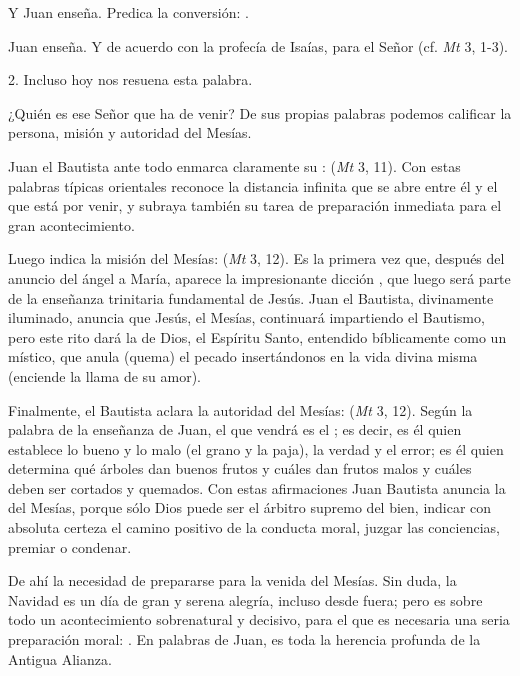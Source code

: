 \begin{body}
\begin{body}
	Y Juan enseña. Predica la conversión: .
	
	Juan enseña. Y de acuerdo con la profecía de Isaías,  para el Señor (cf. \emph{Mt} 3, 1-3).
	
	2. Incluso hoy nos resuena esta palabra.
	
	¿Quién es ese Señor que ha de venir? De sus propias palabras podemos calificar la persona, misión y autoridad del Mesías.
	
	Juan el Bautista ante todo enmarca claramente su :  (\emph{Mt} 3, 11). Con estas palabras típicas orientales reconoce la distancia infinita que se abre entre él y el que está por venir, y subraya también su tarea de preparación inmediata para el gran acontecimiento.
	
	Luego indica la misión del Mesías:  (\emph{Mt} 3, 12). Es la primera vez que, después del anuncio del ángel a María, aparece la impresionante dicción , que luego será parte de la enseñanza trinitaria fundamental de Jesús. Juan el Bautista, divinamente iluminado, anuncia que Jesús, el Mesías, continuará impartiendo el Bautismo, pero este rito dará la  de Dios, el Espíritu Santo, entendido bíblicamente como un  místico, que anula (quema) el pecado insertándonos en la vida divina misma (enciende la llama de su amor).
	
	Finalmente, el Bautista aclara la autoridad del Mesías:  (\emph{Mt} 3, 12). Según la palabra de la enseñanza de Juan, el que vendrá es el ; es decir, es él quien establece lo bueno y lo malo (el grano y la paja), la verdad y el error; es él quien determina qué árboles dan buenos frutos y cuáles dan frutos malos y cuáles deben ser cortados y quemados. Con estas afirmaciones Juan Bautista anuncia la  del Mesías, porque sólo Dios puede ser el árbitro supremo del bien, indicar con absoluta certeza el camino positivo de la conducta moral, juzgar las conciencias, premiar o condenar.
	
	De ahí la necesidad de prepararse para la venida del Mesías. Sin duda, la Navidad es un día de gran y serena alegría, incluso desde fuera; pero es sobre todo un acontecimiento sobrenatural y decisivo, para el que es necesaria una seria preparación moral: . En palabras de Juan, es toda la herencia profunda de la Antigua Alianza.
	

\end{body}
\end{body}
